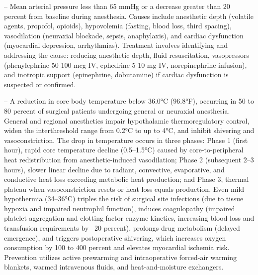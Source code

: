 -- Mean arterial pressure less than 65 mmHg or a decrease greater than 20 percent from baseline during anesthesia. Causes include anesthetic depth (volatile agents, propofol, opioids), hypovolemia (fasting, blood loss, third spacing), vasodilation (neuraxial blockade, sepsis, anaphylaxis), and cardiac dysfunction (myocardial depression, arrhythmias). Treatment involves identifying and addressing the cause: reducing anesthetic depth, fluid resuscitation, vasopressors (phenylephrine 50-100 mcg IV, ephedrine 5-10 mg IV, norepinephrine infusion), and inotropic support (epinephrine, dobutamine) if cardiac dysfunction is suspected or confirmed.

-- A reduction in core body temperature below 36.0°C (96.8°F), occurring in 50 to 80 percent of surgical patients undergoing general or neuraxial anesthesia. General and regional anesthetics impair hypothalamic thermoregulatory control, widen the interthreshold range from 0.2°C to up to 4°C, and inhibit shivering and vasoconstriction. The drop in temperature occurs in three phases: Phase 1 (first hour), rapid core temperature decline (0.5--1.5°C) caused by core-to-peripheral heat redistribution from anesthetic-induced vasodilation; Phase 2 (subsequent 2--3 hours), slower linear decline due to radiant, convective, evaporative, and conductive heat loss exceeding metabolic heat production; and Phase 3, thermal plateau when vasoconstriction resets or heat loss equals production. Even mild hypothermia (34--36°C) triples the risk of surgical site infections (due to tissue hypoxia and impaired neutrophil function), induces coagulopathy (impaired platelet aggregation and clotting factor enzyme kinetics, increasing blood loss and transfusion requirements by ~20 percent), prolongs drug metabolism (delayed emergence), and triggers postoperative shivering, which increases oxygen consumption by 100 to 400 percent and elevates myocardial ischemia risk. Prevention utilizes active prewarming and intraoperative forced-air warming blankets, warmed intravenous fluids, and heat-and-moisture exchangers.

